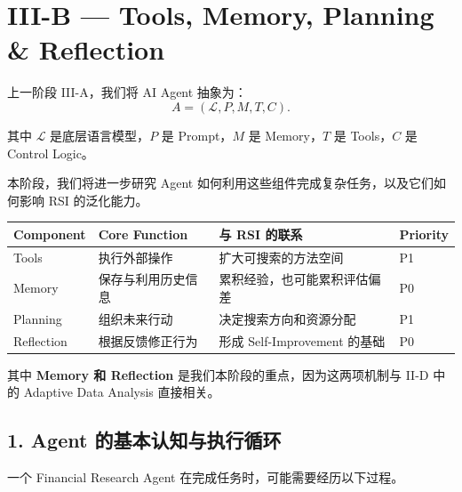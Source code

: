 \hypertarget{part-3-34-0001-iii-b-tools-memory-planning-reflection}{%
\section{III-B --- Tools, Memory, Planning \& Reflection}\label{part-3-34-0001-iii-b-tools-memory-planning-reflection}}

上一阶段 III-A，我们将 AI Agent 抽象为：
\[A=(\mathcal L,P,M,T,C).\]

其中 \(\mathcal L\) 是底层语言模型，\(P\) 是 Prompt，\(M\) 是 Memory，\(T\) 是 Tools，\(C\) 是 Control Logic。

本阶段，我们将进一步研究 Agent 如何利用这些组件完成复杂任务，以及它们如何影响 RSI 的泛化能力。

\begin{readertable}
\begin{longtable}[]{@{}
  >{\raggedright\arraybackslash}p{}
  >{\raggedright\arraybackslash}p{}
  >{\raggedright\arraybackslash}p{}
  >{\raggedright\arraybackslash}p{}@{}}
\toprule
Component & Core Function & 与 RSI 的联系 & Priority \\
\midrule
\endhead
Tools & 执行外部操作 & 扩大可搜索的方法空间 & P1 \\
Memory & 保存与利用历史信息 & 累积经验，也可能累积评估偏差 & P0 \\
Planning & 组织未来行动 & 决定搜索方向和资源分配 & P1 \\
Reflection & 根据反馈修正行为 & 形成 Self-Improvement 的基础 & P0 \\
\bottomrule
\end{longtable}
\end{readertable}

其中 \textbf{Memory 和 Reflection} 是我们本阶段的重点，因为这两项机制与 II-D 中的 Adaptive Data Analysis 直接相关。

\hypertarget{part-3-34-0001-agent-ux7684ux57faux672cux8ba4ux77e5ux4e0eux6267ux884cux5faaux73af}{%
\subsection{1. Agent 的基本认知与执行循环}\label{part-3-34-0001-agent-ux7684ux57faux672cux8ba4ux77e5ux4e0eux6267ux884cux5faaux73af}}

一个 Financial Research Agent 在完成任务时，可能需要经历以下过程。

